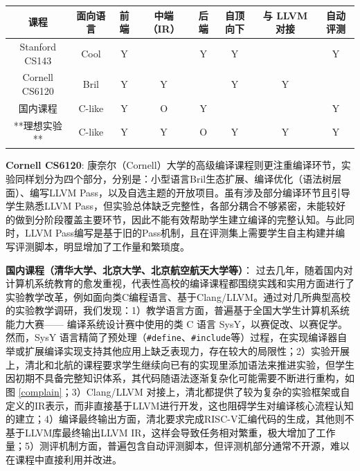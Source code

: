\documentclass{SCIS2020cn}
\begin{document}
\begin{table}
    \label{tab_courses}
    \centering
    \footnotesize
    \tabcolsep 9pt %
    \begin{tabular*}{0.92\textwidth}{cccccccc}
        \toprule
        课程 & 面向语言 & 前端 & 中端（IR）& 后端 & 自顶向下 & 与 LLVM 对接 & 自动评测 \\\hline
        Stanford CS143\cite{stanford_cs143} & Cool & Y &  & Y & Y &  & Y \\
        Cornell CS6120\cite{cornell_cs1620} & Bril & Y & Y & & Y & Y  & \\
        国内课程\cite{thu21_compiler,pku20_compiler, buaa19_compiler} & C-like & Y & O & Y & &  & Y \\
        **理想实验** & C-like & Y & Y & O & Y & Y & Y \\
        \bottomrule
    \end{tabular*}
\end{table}

\textbf{Cornell CS6120}: 康奈尔（Cornell）大学的高级编译课程则更注重编译环节，实验同样划分为四个部分，分别是：小型语言Bril生态扩展、编译优化（语法树层面）、编写LLVM Pass，以及自选主题的开放项目。虽有涉及部分编译环节且引导学生熟悉LLVM Pass，但实验总体缺乏完整性，各部分耦合不够紧密，未能较好的做到分阶段覆盖主要环节，因此不能有效帮助学生建立编译的完整认知。与此同时，LLVM Pass编写是基于旧的Pass机制\cite{llvm_newpass}，且在评测集上需要学生自主构建并编写评测脚本，明显增加了工作量和繁琐度。

\textbf{国内课程（清华大学、北京大学、北京航空航天大学等）}：
过去几年，随着国内对计算机系统教育的愈发重视，代表性高校的编译课程都围绕实践和实用方面进行了实验教学改革，例如面向类C编程语言、基于Clang/LLVM。通过对几所典型高校的实验教学调研，我们发现：1）教学语言方面，普遍基于全国大学生计算机系统能力大赛—— 编译系统设计赛中使用的类 C 语言 SysY\cite{sysy}，以赛促改、以赛促学。然而，SysY 语言精简了预处理（\texttt{\#define}、\texttt{\#include}等）过程，在实现编译器自举或扩展编译实现支持其他应用上缺乏表现力，存在较大的局限性；2）实验开展上，清北和北航的课程要求学生继续向已有的实现里添加语法来推进实验，但学生因初期不具备完整知识体系，其代码随语法逐渐复杂化可能需要不断进行重构，如图 \ref{complain}；3）Clang/LLVM 对接上，清北都提供了较为复杂的实验框架或自定义的IR表示，而非直接基于LLVM进行开发，这也阻碍学生对编译核心流程认知的建立；4）编译最终输出方面，清北要求完成RISC-V汇编代码的生成，其他则不基于LLVM库最终输出LLVM IR，这样会导致任务相对繁重，极大增加了工作量；5）测评机制方面，普遍包含自动评测脚本，但评测机部分通常不开源，难以在课程中直接利用并改进。
\end{document}
